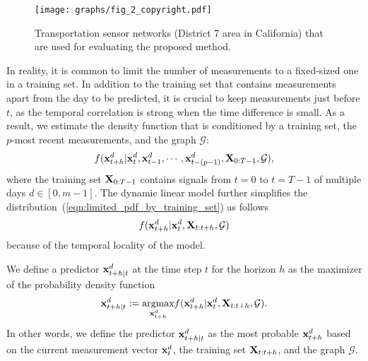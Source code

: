 \documentclass[journal]{IEEEtran}
\begin{document}
\begin{figure}[!t]
\centering
 {{\texttt{[image: graphs/fig\_2\_copyright.pdf]}}}
\caption{Transportation sensor networks (District 7 area in California) that are used for evaluating the proposed method.}\label{fig:test_sites}
\end{figure}

In reality, it is common to limit the number of measurements to a fixed-sized one in a training set. 
In addition to the training set that contains measurements apart from the day to be predicted, it is crucial to keep measurements just before $t$, as the temporal correlation is strong when the time difference is small.
As a result, we estimate the density function that is conditioned by a training set, the $p$-most recent measurements, and the graph $\mathcal{G}$:
\begin{equation}\label{eqn:limited_pdf_by_training_set}
    f({\bf{x}}_{t+h}^d|{\bf{x}}_{t}^d,{\bf{x}}_{t-1}^d,\cdots,{\bf{x}}_{t-(p-1)}^d,{\bf{X}}_{0:T-1},\mathcal{G}),
\end{equation}
where the training set ${\bf{X}}_{0:T-1}$ contains signals from $t=0$ to $t=T-1$ of multiple days $d\in[0,m-1]$.
The dynamic linear model further simplifies the distribution~(\ref{eqn:limited_pdf_by_training_set}) as follows
\begin{equation}
    f({\bf{x}}_{t+h}^d|{\bf{x}}_{t}^d,{\bf{X}}_{t:t+h},\mathcal{G})
\end{equation}
because of the temporal locality of the model.

We define a predictor ${\bf{x}}_{t+h|t}^d$ at the time step $t$ for the horizon $h$ as the maximizer of the probability density function
 \begin{equation}
     {\bf{x}}^d_{t+h|t}:=\underset{{\bf{x}}^d_{t+h}}{
     \text{argmax}}
     f({\bf{x}}_{t+h}^d|{\bf{x}}_{t}^d,{\bf{X}}_{t:t+h},\mathcal{G}).
 \end{equation}
In other words, we define the predictor ${\bf{x}}^d_{t+h|t}$ as the most probable ${\bf{x}}^d_{t+h}$ based on the current measurement vector ${\bf{x}}^d_t$, the training set ${\bf{X}}_{t:t+h}$, and the graph $\mathcal{G}$.
\end{document}
